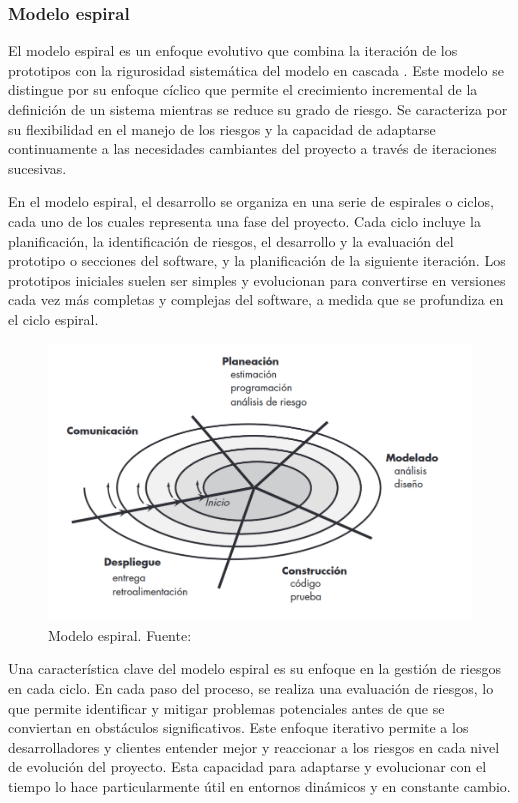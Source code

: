 \documentclass[main.tex]{subfiles}
\begin{document}
\subsubsection{Modelo espiral}

El modelo espiral es un enfoque evolutivo que combina la iteración de los prototipos con la rigurosidad sistemática del modelo en cascada \cite{pressman2010ingeneria}. Este modelo se distingue por su enfoque cíclico que permite el crecimiento incremental de la definición de un sistema mientras se reduce su grado de riesgo. Se caracteriza por su flexibilidad en el manejo de los riesgos y la capacidad de adaptarse continuamente a las necesidades cambiantes del proyecto a través de iteraciones sucesivas.

En el modelo espiral, el desarrollo se organiza en una serie de espirales o ciclos, cada uno de los cuales representa una fase del proyecto. Cada ciclo incluye la planificación, la identificación de riesgos, el desarrollo y la evaluación del prototipo o secciones del software, y la planificación de la siguiente iteración. Los prototipos iniciales suelen ser simples y evolucionan para convertirse en versiones cada vez más completas y complejas del software, a medida que se profundiza en el ciclo espiral.

\begin{figure}[h]
	\centering
	\includegraphics[width=\linewidth]{../assets/model-spiral.png}
	\caption{Modelo espiral. Fuente: \cite{pressman2010ingeneria}}
\end{figure}

Una característica clave del modelo espiral es su enfoque en la gestión de riesgos en cada ciclo. En cada paso del proceso, se realiza una evaluación de riesgos, lo que permite identificar y mitigar problemas potenciales antes de que se conviertan en obstáculos significativos. Este enfoque iterativo permite a los desarrolladores y clientes entender mejor y reaccionar a los riesgos en cada nivel de evolución del proyecto. Esta capacidad para adaptarse y evolucionar con el tiempo lo hace particularmente útil en entornos dinámicos y en constante cambio.
\end{document}
